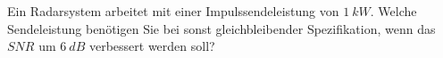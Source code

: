 \begin{question}[section=12,name={Radarsystem},difficulty=,quantity=,type=thr,tags={20130724}]
	Ein Radarsystem arbeitet mit einer Impulssendeleistung von $1~kW$. Welche Sendeleistung benötigen Sie bei sonst gleichbleibender Spezifikation, wenn das $SNR$ um $6~dB$ verbessert werden soll?
	
	
\end{question}
\begin{solution}
	
\end{solution}